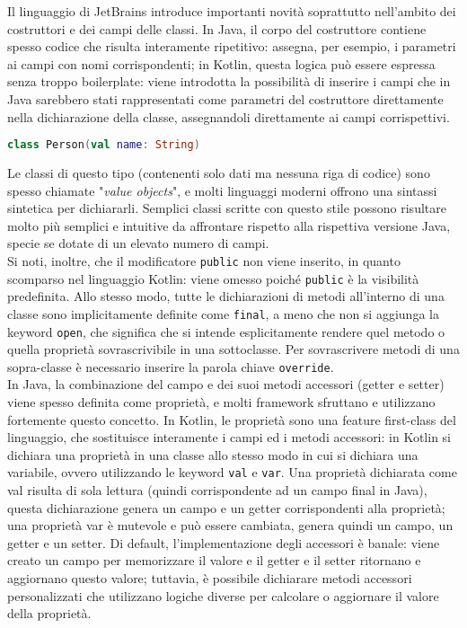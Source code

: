 Il linguaggio di JetBrains introduce importanti novità soprattutto nell’ambito dei costruttori e dei campi delle classi. In Java, il corpo del costruttore contiene spesso codice che risulta interamente ripetitivo: assegna, per esempio, i parametri ai campi con nomi corrispondenti; in Kotlin, questa logica può essere espressa senza troppo boilerplate: viene introdotta la possibilità di inserire i campi che in Java sarebbero stati rappresentati come parametri del costruttore direttamente nella dichiarazione della classe, assegnandoli direttamente ai campi corrispettivi.\\

\begin{lstlisting}[caption={Classe \texttt{Person} con una proprietà \texttt{name}}, captionpos=b, label={lst:exampleClassDeclaration}, language=Kotlin]
class Person(val name: String)
\end{lstlisting}

Le classi di questo tipo (contenenti solo dati ma nessuna riga di codice) sono spesso
chiamate "{\em value objects}", e molti linguaggi moderni offrono una sintassi sintetica per dichiararli.
Semplici classi scritte con questo stile possono risultare molto più semplici e intuitive da affrontare rispetto alla rispettiva versione Java, specie se dotate di un elevato numero di campi.\\
Si noti, inoltre, che il modificatore \texttt{public} non viene inserito, in quanto scomparso nel linguaggio Kotlin: viene omesso poiché \texttt{public} è la visibilità predefinita. Allo stesso modo, tutte le dichiarazioni di metodi all’interno di una classe sono implicitamente definite come \texttt{final}, a meno che non si aggiunga la keyword \texttt{open}, che significa che si intende esplicitamente rendere quel metodo o quella proprietà sovrascrivibile in una sottoclasse. Per sovrascrivere metodi di una sopra-classe è necessario inserire la parola chiave \texttt{override}.\\

In Java, la combinazione del campo e dei suoi metodi accessori (getter e setter) viene spesso definita come proprietà, e molti framework sfruttano e utilizzano fortemente questo concetto. In Kotlin, le proprietà sono una feature first-class del linguaggio, che sostituisce interamente i campi ed i metodi accessori: in Kotlin si dichiara una proprietà in una classe allo stesso modo in cui si dichiara una variabile, ovvero utilizzando le keyword \texttt{val} e \texttt{var}. Una proprietà dichiarata come val risulta di sola lettura (quindi corrispondente ad un campo final in Java), questa dichiarazione genera un campo e un getter corrispondenti alla proprietà; una proprietà var è mutevole e può essere cambiata, genera quindi un campo, un getter e un setter. Di default, l'implementazione degli accessori è banale: viene creato un campo per memorizzare il valore e il getter e il setter ritornano e aggiornano questo valore; tuttavia, è possibile dichiarare metodi accessori personalizzati che utilizzano logiche diverse per calcolare o aggiornare il valore della proprietà.\\

